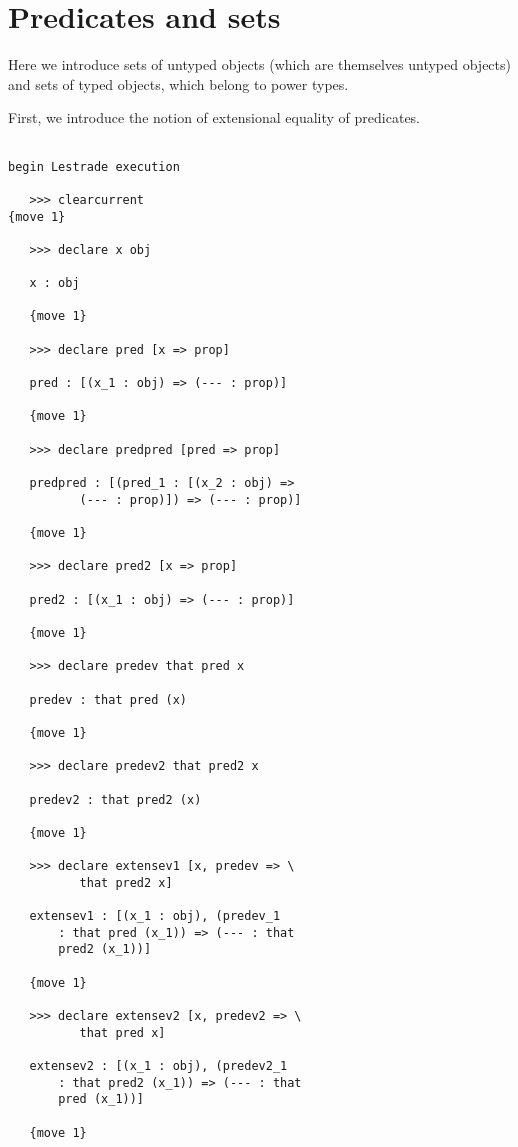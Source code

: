 \documentclass[12pt]{article}
\begin{document}
\newpage

\section{Predicates and sets}

Here we introduce sets of untyped objects (which are themselves untyped objects) and sets of typed objects, which belong to power types.

First, we introduce the notion of extensional equality of predicates.

\begin{verbatim}

begin Lestrade execution

   >>> clearcurrent
{move 1}

   >>> declare x obj

   x : obj

   {move 1}

   >>> declare pred [x => prop]

   pred : [(x_1 : obj) => (--- : prop)]

   {move 1}

   >>> declare predpred [pred => prop]

   predpred : [(pred_1 : [(x_2 : obj) => 
          (--- : prop)]) => (--- : prop)]

   {move 1}

   >>> declare pred2 [x => prop]

   pred2 : [(x_1 : obj) => (--- : prop)]

   {move 1}

   >>> declare predev that pred x

   predev : that pred (x)

   {move 1}

   >>> declare predev2 that pred2 x

   predev2 : that pred2 (x)

   {move 1}

   >>> declare extensev1 [x, predev => \
          that pred2 x]

   extensev1 : [(x_1 : obj), (predev_1 
       : that pred (x_1)) => (--- : that 
       pred2 (x_1))]

   {move 1}

   >>> declare extensev2 [x, predev2 => \
          that pred x]

   extensev2 : [(x_1 : obj), (predev2_1 
       : that pred2 (x_1)) => (--- : that 
       pred (x_1))]

   {move 1}


\end{verbatim}
\end{document}
